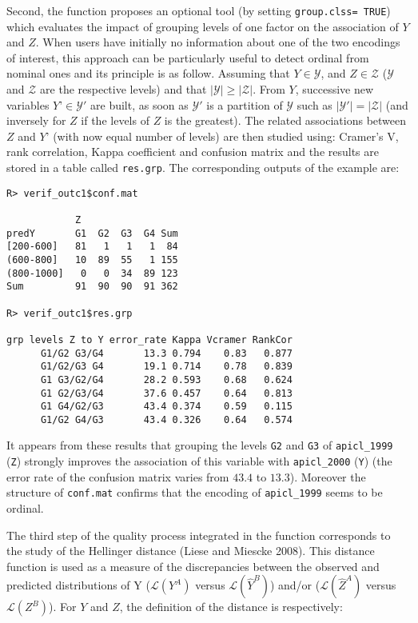 Second, the function proposes an optional tool (by setting \texttt{group.clss=\ TRUE}) which evaluates the impact of grouping levels of one factor on the association of \(Y\) and \(Z\). When users have initially no information about one of the two encodings of interest, this approach can be particularly useful to detect ordinal from nominal ones and its principle is as follow. Assuming that \(Y \in \mathcal{Y}\), and \(Z \in \mathcal{Z}\) (\(\mathcal{Y}\) and \(\mathcal{Z}\) are the respective levels) and that \(|\mathcal{Y}| \geq |\mathcal{Z}|\). From \(Y\), successive new variables \(Y’ \in \mathcal{Y}'\) are built, as soon as \(\mathcal{Y}'\) is a partition of \(\mathcal{Y}\) such as \(|\mathcal{Y}'| = |\mathcal{Z}|\) (and inversely for \(Z\) if the levels of \(Z\) is the greatest). The related associations between \(Z\) and \(Y’\) (with now equal number of levels) are then studied using: Cramer's V, rank correlation, Kappa coefficient and confusion matrix and the results are stored in a table called \texttt{res.grp}. The corresponding outputs of the example are:

\begin{verbatim}
R> verif_outc1$conf.mat

            Z
predY       G1  G2  G3  G4 Sum
[200-600]   81   1   1   1  84
(600-800]   10  89  55   1 155
(800-1000]   0   0  34  89 123
Sum         91  90  90  91 362

R> verif_outc1$res.grp

grp levels Z to Y error_rate Kappa Vcramer RankCor
      G1/G2 G3/G4       13.3 0.794    0.83   0.877
      G1/G2/G3 G4       19.1 0.714    0.78   0.839
      G1 G3/G2/G4       28.2 0.593    0.68   0.624
      G1 G2/G3/G4       37.6 0.457    0.64   0.813
      G1 G4/G2/G3       43.4 0.374    0.59   0.115
      G1/G2 G4/G3       43.4 0.326    0.64   0.574
\end{verbatim}

It appears from these results that grouping the levels \texttt{G2} and \texttt{G3} of \texttt{apicl\_1999} (\texttt{Z}) strongly improves the association of this variable with \texttt{apicl\_2000} (\texttt{Y}) (the error rate of the confusion matrix varies from \(43.4\) to \(13.3\)). Moreover the structure of \texttt{conf.mat} confirms that the encoding of \texttt{apicl\_1999} seems to be ordinal.

The third step of the quality process integrated in the function corresponds to the study of the Hellinger distance (Liese and Miescke 2008). This distance function is used as a measure of the discrepancies between the observed and predicted distributions of Y (\(\mathcal{L}(Y^A)\) versus \(\mathcal{L}(\widehat{Y}^B)\)) and/or (\(\mathcal{L}(\widehat{Z}^A)\) versus \(\mathcal{L}(Z^B)\)). For \(Y\) and \(Z\), the definition of the distance is respectively:

